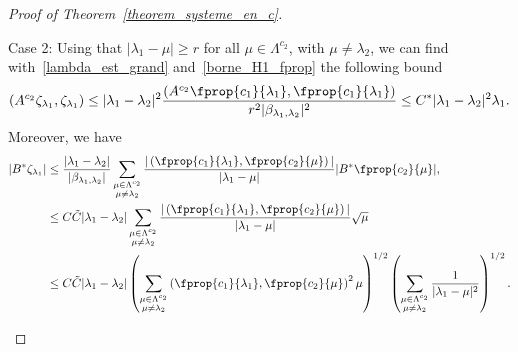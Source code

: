 \begin{proof}[Proof of Theorem~\ref{theorem_systeme_en_c}]
\begin{step}{Case 2:}
Using that $|\lambda_1-\mu|\geq r$ for all $\mu\in \Lambda^{c_2}$, with $\mu\neq \lambda_2$, we can find with~\eqref{lambda_est_grand} and~\eqref{borne_H1_fprop} the following bound
\begin{equation}\label{borne_chi_lambda1}
\left(A^{c_2} \zeta_{\lambda_1},\zeta_{\lambda_1}\right) \leq |\lambda_1-\lambda_2|^2 \frac{\left(A^{c_2} \fprop{c_1}{\lambda_1}, \fprop{c_1}{\lambda_1}\right)}{r^2|\beta_{\lambda_1,\lambda_2}|^2} \leq C^* |\lambda_1-\lambda_2|^2 \lambda_1.
\end{equation}
Moreover, we have
\begin{align*}
|B^* \zeta_{\lambda_1}| & \leq \frac{|\lambda_1-\lambda_2|}{|\beta_{\lambda_1,\lambda_2}|} \sum_{\substack{\mu\in \Lambda^{c_2}\\ \mu\neq \lambda_2}} \frac{|\left(\fprop{c_1}{\lambda_1}, \fprop{c_2}{\mu}\right)|}{|\lambda_1-\mu|} |B^* \fprop{c_2}{\mu}|, \\
& \leq C \tilde{C} |\lambda_1-\lambda_2| \sum_{\substack{\mu\in \Lambda^{c_2}\\ \mu\neq \lambda_2}} \frac{|\left(\fprop{c_1}{\lambda_1}, \fprop{c_2}{\mu}\right)|}{|\lambda_1-\mu|} \sqrt{\mu} \\
& \leq C \tilde{C} |\lambda_1-\lambda_2| \left(\sum_{\substack{\mu\in \Lambda^{c_2}\\ \mu\neq \lambda_2}} \left(\fprop{c_1}{\lambda_1}, \fprop{c_2}{\mu}\right)^2\mu \right)^{1/2} \left(\sum_{\substack{\mu\in \Lambda^{c_2}\\ \mu\neq \lambda_2}} \frac{1}{|\lambda_1-\mu|^2} \right)^{1/2}.
\end{align*}


\end{step}
\end{proof}
